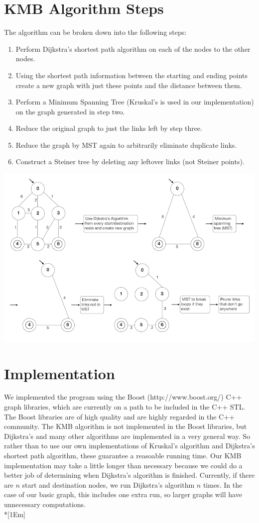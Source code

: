 \documentclass[12pt]{article}
\begin{document}
\begin{raggedright}
\section*{KMB Algorithm Steps}
The algorithm can be broken down into the following steps:
\begin{enumerate}
\item Perform Dijkstra's shortest path algorithm on each of the nodes to the other nodes.
\item Using the shortest path information between the starting and ending points create a new graph with just these points and the distance between them.
\item Perform a Minimum Spanning Tree (Kruskal's is used in our implementation) on the graph generated in step two.
\item Reduce the original graph to just the links left by step three.
\item Reduce the graph by MST again to arbitrarily eliminate duplicate links.
\item Construct a Steiner tree by deleting any leftover links (not Steiner points).
\end{enumerate}
\includegraphics{kmb.png}

\section*{Implementation}
We implemented the program using the Boost (http://www.boost.org/) C++ graph 
libraries, which are currently on a path to be included in the C++ STL. The Boost
libraries are of high quality and are highly regarded in the C++ community. The KMB 
algorithm is not implemented in the Boost libraries, but Dijkstra's and many 
other algorithms are implemented in a very general way. So rather than to use our own 
implementations of Kruskal's algorithm and Dijkstra's shortest path algorithm, 
these guarantee a reasoable running time. Our KMB implementation may take a 
little longer than necessary because we could do a better job of determining 
when Dijkstra's algorithm is finished. Currently, if there are $n$ start and destination 
nodes, we run Dijkstra's algorithm $n$ times. In the case of our basic graph, this includes
one extra run, so larger graphs will have unnecessary computations.\\*[1Em]


\end{raggedright}
\end{document}
